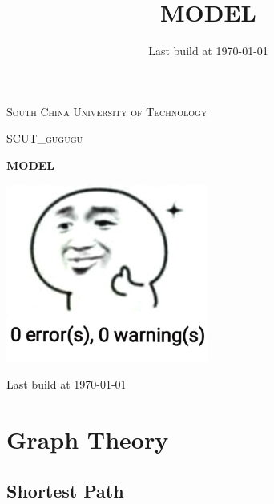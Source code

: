 \documentclass[10pt]{ctexart}
\title{MODEL}
\author{}
\date{Last build at \today}
\begin{document}
{
\begin{titlepage}
    \centering
    \vspace{2cm}
    {\scshape\Large South China University of Technology \par}
    \vspace{1cm}
    {\scshape\Large SCUT\_gugugu\par}
    \vspace{1.5cm}
    {\Huge\bfseries MODEL\par}
    \vspace{4.5cm}
    \includegraphics[width=0.5\textwidth]{./LOGO}\par\vspace{1cm}

    \vfill

    {\large Last build at \today\par}

\thispagestyle{empty}
\end{titlepage}
\tableofcontents
\newpage
\section{Graph Theory}
\subsection{Shortest Path}

}
\end{document}
